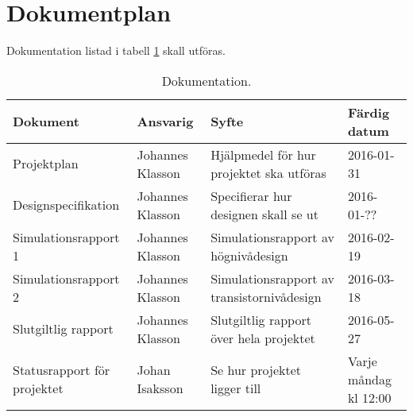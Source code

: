 \section{Dokumentplan}
Dokumentation listad i tabell \ref{dokumentation:tabell} skall utföras.

\begin{table}[H]
	\centering
		\begin{tabularx}{\textwidth}{| X | l | X | X |}
			\hline
			\textbf{Dokument} & \textbf{Ansvarig} & \textbf{Syfte} & \textbf{Färdig datum} \\\hline
			
			
			{Projektplan} & {Johannes Klasson} & {Hjälpmedel för hur projektet ska utföras} & {2016-01-31} \\\hline
			
			{Designspecifikation} & {Johannes Klasson} & {Specifierar hur designen skall se ut} & {2016-01-??} \\\hline
			
			{Simulationsrapport 1} & {Johannes Klasson} & {Simulationsrapport av högnivådesign} & {2016-02-19} \\\hline
			
			{Simulationsrapport 2} & {Johannes Klasson} & {Simulationsrapport av transistornivådesign} & {2016-03-18} \\\hline
			
			{Slutgiltlig rapport} & {Johannes Klasson} & {Slutgiltlig rapport över hela projektet} & {2016-05-27} \\\hline
			
			{Statusrapport för projektet} & {Johan Isaksson} & {Se hur projektet ligger till} & {Varje måndag kl 12:00} \\\hline
            
			
			
		\end{tabularx}
	\caption{Dokumentation.} \label{dokumentation:tabell}
\end{table}
